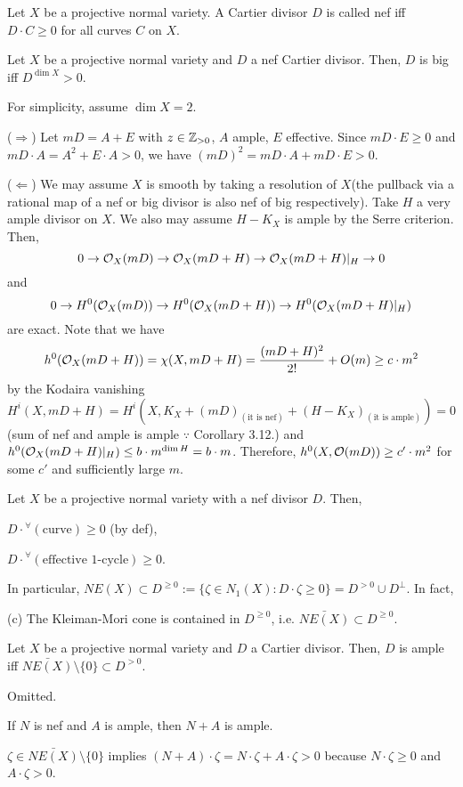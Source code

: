 \documentclass{../../small}
\begin{document}
\setcounter{thm}{7}
\begin{defn}
Let $X$ be a projective normal variety.
A Cartier divisor $D$ is called nef iff $D\cdot C\ge0$ for all curves $C$ on $X$.
\end{defn}
\begin{prop}
Let $X$ be a projective normal variety and $D$ a nef Cartier divisor.
Then, $D$ is big iff $D^{\dim X}>0$.
\end{prop}


\begin{pf}
For simplicity, assume $\dim X=2$.

($\Rightarrow$)
Let $mD=A+E$ with $z\in\mathbb{Z}_{>0}$, $A$ ample, $E$ effective.
Since $mD\cdot E\ge0$ and $mD\cdot A=A^2+E\cdot A>0$, we have $(mD)^2=mD\cdot A+mD\cdot E>0$.

($\Leftarrow$)
We may assume $X$ is smooth by taking a resolution of $X$(the pullback via a rational map of a nef or big divisor is also nef of big respectively).
Take $H$ a very ample divisor on $X$.
We also may assume $H-K_X$ is ample by the Serre criterion.
Then,
\[0\to\mathcal{O}_X(mD)\to\mathcal{O}_X(mD+H)\to\mathcal{O}_X(mD+H)|_H\to0\]
and
\[0\to H^0(\mathcal{O}_X(mD))\to H^0(\mathcal{O}_X(mD+H))\to H^0(\mathcal{O}_X(mD+H)|_H)\]
are exact.
Note that we have
\[h^0(\mathcal{O}_X(mD+H))=\chi(X,mD+H)=\frac{(mD+H)^2}{2!}+O(m)\ge c\cdot m^2\]
by the Kodaira vanishing
\[H^i(X,mD+H)=H^i(X,K_X+(mD)_{(\text{it is nef})}+(H-K_X)_{(\text{it is ample})})=0\]
(sum of nef and ample is ample $\because$ Corollary 3.12.)
and $h^0(\mathcal{O}_X(mD+H)|_H)\le b\cdot m^{\dim H}=b\cdot m$.
Therefore, $h^0(X,\mathcal{O}(mD))\ge c'\cdot m^2$ for some $c'$ and sufficiently large $m$.
\end{pf}

\begin{rmk}
Let $X$ be a projective normal variety with a nef divisor $D$.
Then,
\begin{parts}
\item $D\cdot{}^\forall(\text{curve})\ge0$ (by def),
\item $D\cdot{}^\forall(\text{effective 1-cycle})\ge0$.
\end{parts}
In particular, $NE(X)\subset D^{\ge0}:=\{\zeta\in N_1(X):D\cdot\zeta\ge0\}=D^{>0}\cup D^\perp$.
In fact,
\begin{parts}
\item[(c)] The Kleiman-Mori cone is contained in $D^{\ge0}$, i.e. $\bar{NE(X)}\subset D^{\ge0}$.
\end{parts}
\end{rmk}

\begin{thm}
Let $X$ be a projective normal variety and $D$ a Cartier divisor.
Then, $D$ is ample iff $\bar{NE(X)}\setminus\{0\}\subset D^{>0}$.
\end{thm}
\begin{pf}
Omitted.
\end{pf}
\begin{cor}
If $N$ is nef and $A$ is ample, then $N+A$ is ample.
\end{cor}
\begin{pf}
$\zeta\in\bar{NE(X)}\setminus\{0\}$ implies $(N+A)\cdot\zeta=N\cdot\zeta+A\cdot\zeta>0$ because $N\cdot\zeta\ge0$ and $A\cdot\zeta>0$.
\end{pf}
\end{document}
